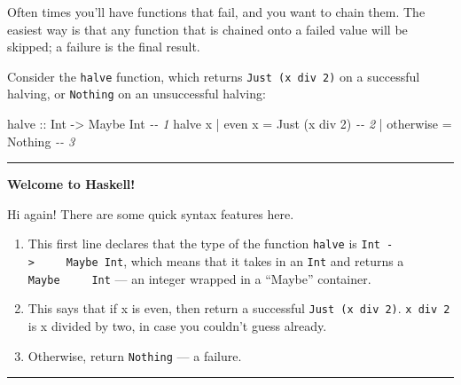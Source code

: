 \documentclass[]{article}
\newenvironment{Shaded}{}{}
\newcommand{\CommentTok}[1]{\textcolor[rgb]{0.38,0.63,0.69}{\textit{#1}}}
\newcommand{\DataTypeTok}[1]{\textcolor[rgb]{0.56,0.13,0.00}{#1}}
\newcommand{\DecValTok}[1]{\textcolor[rgb]{0.25,0.63,0.44}{#1}}
\newcommand{\FunctionTok}[1]{\textcolor[rgb]{0.02,0.16,0.49}{#1}}
\newcommand{\NormalTok}[1]{#1}
\newcommand{\OperatorTok}[1]{\textcolor[rgb]{0.40,0.40,0.40}{#1}}
\newcommand{\OtherTok}[1]{\textcolor[rgb]{0.00,0.44,0.13}{#1}}
\begin{document}
Often times you'll have functions that fail, and you want to chain them. The
easiest way is that any function that is chained onto a failed value will be
skipped; a failure is the final result.

Consider the \texttt{halve} function, which returns
\texttt{Just\ (x\ \textasciigrave{}div\textasciigrave{}\ 2)} on a successful
halving, or \texttt{Nothing} on an unsuccessful halving:

\begin{Shaded}
\begin{Highlighting}[]
\OtherTok{halve ::} \DataTypeTok{Int} \OtherTok{{-}\textgreater{}} \DataTypeTok{Maybe} \DataTypeTok{Int}                       \CommentTok{{-}{-} 1}
\NormalTok{halve x }\OperatorTok{|} \FunctionTok{even}\NormalTok{ x    }\OtherTok{=} \DataTypeTok{Just}\NormalTok{ (x }\OtherTok{\textasciigrave{}div\textasciigrave{}} \DecValTok{2}\NormalTok{)          }\CommentTok{{-}{-} 2}
        \OperatorTok{|} \FunctionTok{otherwise} \OtherTok{=} \DataTypeTok{Nothing}                   \CommentTok{{-}{-} 3}
\end{Highlighting}
\end{Shaded}

\begin{center}\rule{0.5\linewidth}{0.5pt}\end{center}

\textbf{Welcome to Haskell!}

Hi again! There are some quick syntax features here.

\begin{enumerate}
\def\labelenumi{\arabic{enumi}.}
\tightlist
\item
  This first line declares that the type of the function \texttt{halve} is
  \texttt{Int\ -\textgreater{}\ \ \ \ \ Maybe\ Int}, which means that it takes
  in an \texttt{Int} and returns a \texttt{Maybe\ \ \ \ \ Int} --- an integer
  wrapped in a ``Maybe'' container.
\item
  This says that if x is even, then return a successful
  \texttt{Just\ (x\ \textasciigrave{}div\textasciigrave{}\ 2)}.
  \texttt{x\ \textasciigrave{}div\textasciigrave{}\ 2} is x divided by two, in
  case you couldn't guess already.
\item
  Otherwise, return \texttt{Nothing} --- a failure.
\end{enumerate}

\begin{center}\rule{0.5\linewidth}{0.5pt}\end{center}
\end{document}
